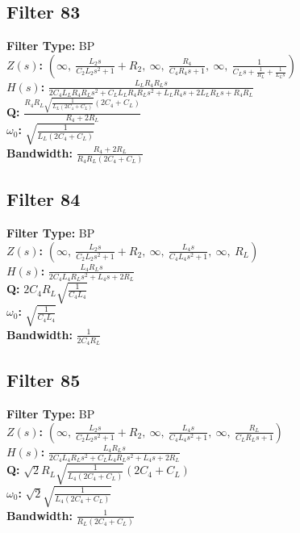 \documentclass{article}
\begin{document}
\subsection*{Filter 83}
\textbf{Filter Type:} BP \\ 
\textbf{$Z(s)$:} $\left( \infty, \  \frac{L_{2} s}{C_{2} L_{2} s^{2} + 1} + R_{2}, \  \infty, \  \frac{R_{4}}{C_{4} R_{4} s + 1}, \  \infty, \  \frac{1}{C_{L} s + \frac{1}{R_{L}} + \frac{1}{L_{L} s}}\right)$ \\ 
\textbf{$H(s)$:} $\frac{L_{L} R_{4} R_{L} s}{2 C_{4} L_{L} R_{4} R_{L} s^{2} + C_{L} L_{L} R_{4} R_{L} s^{2} + L_{L} R_{4} s + 2 L_{L} R_{L} s + R_{4} R_{L}}$ \\ 
\textbf{Q:} $\frac{R_{4} R_{L} \sqrt{\frac{1}{L_{L} \left(2 C_{4} + C_{L}\right)}} \left(2 C_{4} + C_{L}\right)}{R_{4} + 2 R_{L}}$ \\ 
\textbf{$\omega_0$:} $\sqrt{\frac{1}{L_{L} \left(2 C_{4} + C_{L}\right)}}$ \\ 
\textbf{Bandwidth:} $\frac{R_{4} + 2 R_{L}}{R_{4} R_{L} \left(2 C_{4} + C_{L}\right)}$ \\ 
\subsection*{Filter 84}
\textbf{Filter Type:} BP \\ 
\textbf{$Z(s)$:} $\left( \infty, \  \frac{L_{2} s}{C_{2} L_{2} s^{2} + 1} + R_{2}, \  \infty, \  \frac{L_{4} s}{C_{4} L_{4} s^{2} + 1}, \  \infty, \  R_{L}\right)$ \\ 
\textbf{$H(s)$:} $\frac{L_{4} R_{L} s}{2 C_{4} L_{4} R_{L} s^{2} + L_{4} s + 2 R_{L}}$ \\ 
\textbf{Q:} $2 C_{4} R_{L} \sqrt{\frac{1}{C_{4} L_{4}}}$ \\ 
\textbf{$\omega_0$:} $\sqrt{\frac{1}{C_{4} L_{4}}}$ \\ 
\textbf{Bandwidth:} $\frac{1}{2 C_{4} R_{L}}$ \\ 
\subsection*{Filter 85}
\textbf{Filter Type:} BP \\ 
\textbf{$Z(s)$:} $\left( \infty, \  \frac{L_{2} s}{C_{2} L_{2} s^{2} + 1} + R_{2}, \  \infty, \  \frac{L_{4} s}{C_{4} L_{4} s^{2} + 1}, \  \infty, \  \frac{R_{L}}{C_{L} R_{L} s + 1}\right)$ \\ 
\textbf{$H(s)$:} $\frac{L_{4} R_{L} s}{2 C_{4} L_{4} R_{L} s^{2} + C_{L} L_{4} R_{L} s^{2} + L_{4} s + 2 R_{L}}$ \\ 
\textbf{Q:} $\sqrt{2} R_{L} \sqrt{\frac{1}{L_{4} \left(2 C_{4} + C_{L}\right)}} \left(2 C_{4} + C_{L}\right)$ \\ 
\textbf{$\omega_0$:} $\sqrt{2} \sqrt{\frac{1}{L_{4} \left(2 C_{4} + C_{L}\right)}}$ \\ 
\textbf{Bandwidth:} $\frac{1}{R_{L} \left(2 C_{4} + C_{L}\right)}$ \\ 
\end{document}
